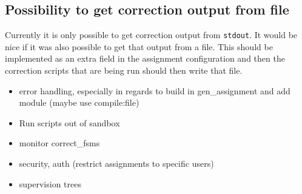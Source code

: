 \subsection{Possibility to get correction output from file}
Currently it is only possible to get correction output from \texttt{stdout}. It
would be nice if it was also possible to get that output from a file. This
should be implemented as an extra field in the assignment configuration and then
the correction scripts that are being run should then write that file.

\begin{itemize}
    \item error handling, especially in regards to build in gen\_assignment and
    add module (maybe use compile:file)
    \item Run scripts out of sandbox
    \item monitor correct\_fsms
    \item security, auth (restrict assignments to specific users)
    \item supervision trees
\end{itemize}
